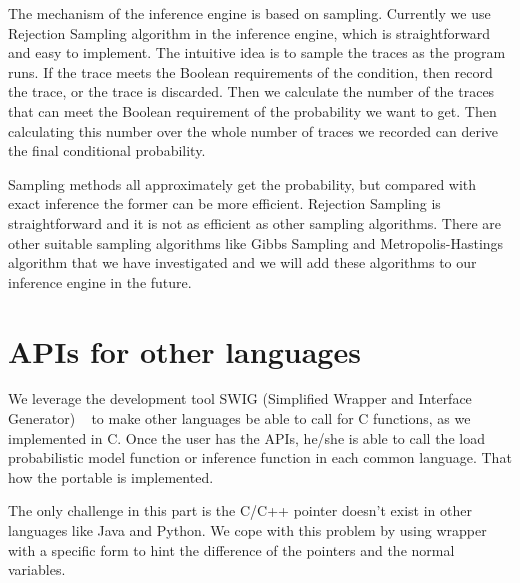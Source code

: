 The mechanism of the inference engine is based on sampling. Currently we use Rejection Sampling algorithm in the inference engine, which is straightforward and easy to implement. The intuitive idea is to sample the traces as the program runs. If the trace meets the Boolean requirements of the condition, then record the trace, or the trace is discarded. Then we calculate the number of the traces that can meet the Boolean requirement of the probability we want to get. Then calculating this number over the whole number of traces we recorded can derive the final conditional probability. 

Sampling methods all approximately get the probability, but compared with exact inference the former can be more efficient. Rejection Sampling is straightforward and it is not as efficient as other sampling algorithms. There are other suitable sampling algorithms like Gibbs Sampling and Metropolis-Hastings algorithm that we have investigated and we will add these algorithms to our inference engine in the future.

\section{APIs for other languages}
\label{sec:api}
We leverage the development tool SWIG (Simplified Wrapper and Interface Generator) ~\cite{swig} to make other languages be able to call for C functions, as we implemented in C. Once the user has the APIs, he/she is able to call the load probabilistic model function or inference function in each common language. That how the portable is implemented. 

	The only challenge in this part is the C/C++ pointer doesn’t exist in other languages like Java and Python. We cope with this problem by using wrapper with a specific form to hint the difference of the pointers and the normal variables.
